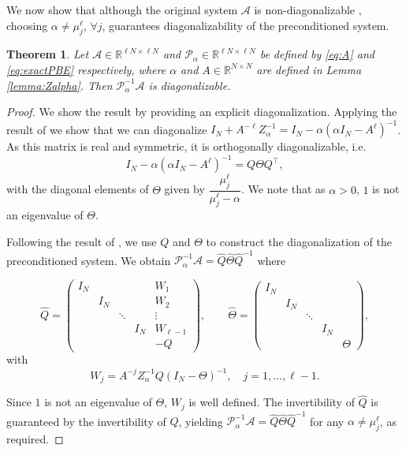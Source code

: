 \documentclass{article}
\newtheorem{thm}{Theorem}
\newcommand{\sizeA}{N}
\theoremstyle{definition}
\newcommand{\Dalt}{\Theta}
\begin{document}
	We now show that although the original system $\mathcal{A}$ is non-diagonalizable \cite{weaver2018time}, choosing ${\alpha\ne \mu_j^\ell}$, $\forall j$, guarantees diagonalizability of the preconditioned system.
	\begin{thm}
		Let $\mathcal{A} \in \mathbb{R}^{\ell N \times \ell N}$ and $\mathcal{P}_{\alpha} \in \mathbb{R}^{\ell N \times \ell N}$ be defined by \eqref{eq:A} and \eqref{eq:exactPBE} respectively, where $\alpha$ and ${A} \in \mathbb{R}^{N \times N}$ are defined in Lemma \ref{lemma:Zalpha}.
		Then  $\mathcal{P}_{\alpha}^{-1}\mathcal{A}$ is diagonalizable.
	\end{thm}
	\begin{proof}
		We show the result by providing an explicit diagonalization. 
		Applying the result of \cite[Lemma 3.3]{LinNgalphacirculant2021} we show that we can diagonalize $I_\sizeA + A^{-\ell}Z_\alpha^{-1} = I_\sizeA - \alpha(\alpha I_\sizeA - A^{\ell})^{-1}$. %
		As this matrix is real and symmetric, it is orthogonally diagonalizable, i.e.
		$$I_\sizeA - \alpha(\alpha I_\sizeA - A^{\ell})^{-1} = Q\Dalt Q^{\top},$$ with the diagonal elements of $\Dalt $ given by $\dfrac{\mu_j^{\ell}}{\mu_j^\ell-\alpha}$.
		We note that as $\alpha > 0$,  $1$ is not an eigenvalue of $\Dalt $. 
		
		Following the result of \cite[Theorem 3.4]{LinNgalphacirculant2021}, we use $Q$ and $\Dalt $ to construct the diagonalization of the preconditioned system. We obtain
		$\mathcal{P}_{\alpha}^{-1}\mathcal{A} = \widehat{Q}\widehat{\Dalt }\widehat{Q}^{-1}$ where 
		
		$$\widehat{Q} = \begin{pmatrix} I_\sizeA &&&&{W_1} \\ & I_\sizeA &&& { W_2}\\ &&\ddots && \vdots \\ &&&I_\sizeA & { W_{{\ell}-1} }\\ &&&&-Q
			
		\end{pmatrix},\qquad \widehat{\Dalt } = \begin{pmatrix} I_\sizeA &&&& \\ & I_\sizeA &&& \\ &&\ddots && \\ &&&I_\sizeA \\ &&&&\Dalt 
			
		\end{pmatrix},$$
		with 
		$${W_j} = A^{-j}Z_\alpha^{-1}Q(I_\sizeA-\Dalt )^{-1}, \quad j = 1,\dots,\ell-1.$$
		
		Since $1$ is not an eigenvalue of $\Dalt $, 
		$    W_j$ is well defined. The invertibility of $\widehat{Q}$ is guaranteed by the invertibility of $Q$, yielding $\mathcal{P}_\alpha^{-1}\mathcal{A} = \widehat{Q}\widehat{\Dalt }\widehat{Q}^{-1}$ for any $\alpha\ne \mu_j^{\ell}$, as required.
	\end{proof}
	
\end{document}
